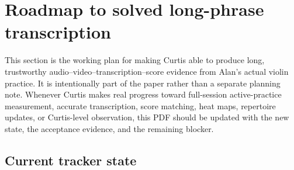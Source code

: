 \section{Roadmap to solved long-phrase transcription}
\label{sec:roadmap}

This section is the working plan for making Curtis able to produce long, trustworthy audio--video--transcription--score evidence from Alan's actual violin practice. It is intentionally part of the paper rather than a separate planning note. Whenever Curtis makes real progress toward full-session active-practice measurement, accurate transcription, score matching, heat maps, repertoire updates, or Curtis-level observation, this PDF should be updated with the new state, the acceptance evidence, and the remaining blocker.

\subsection{Current tracker state}

